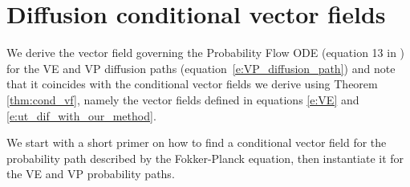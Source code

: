 \documentclass{article}
\newcommand{\too}{\rightarrow}
\def\eqref#1{equation~\ref{#1}}
\begin{document}

\section{Diffusion conditional vector fields}
\label{A:diff_cond_VP}

We derive the vector field governing the Probability Flow ODE (equation 13 in \cite{song2020score}) for the VE and VP diffusion paths (\eqref{e:VP_diffusion_path}) and note that it coincides with the conditional vector fields we derive using Theorem \ref{thm:cond_vf}, namely the vector fields defined in equations \ref{e:VE} and \ref{e:ut_dif_with_our_method}.

We start with a short primer on how to find a conditional vector field for the probability path described by the Fokker-Planck equation, then instantiate it for the VE and VP probability paths. 
\end{document}
